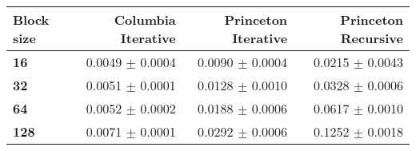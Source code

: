 \begin{tabular}{lrrr}\toprule
\textbf{Block size}  & \textbf{Columbia Iterative} & \textbf{Princeton Iterative} & \textbf{Princeton Recursive}\\\midrule
\textbf{16}  & 0.0049 $\pm$ 0.0004 & 0.0090 $\pm$ 0.0004 & 0.0215 $\pm$ 0.0043\\
\textbf{32}  & 0.0051 $\pm$ 0.0001 & 0.0128 $\pm$ 0.0010 & 0.0328 $\pm$ 0.0006\\
\textbf{64}  & 0.0052 $\pm$ 0.0002 & 0.0188 $\pm$ 0.0006 & 0.0617 $\pm$ 0.0010\\
\textbf{128} & 0.0071 $\pm$ 0.0001 & 0.0292 $\pm$ 0.0006 & 0.1252 $\pm$ 0.0018\\
\bottomrule
\end{tabular}
